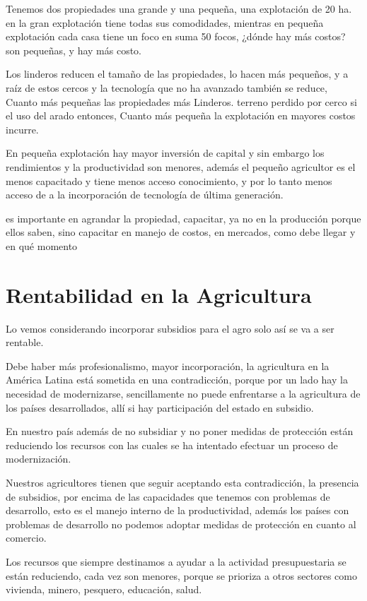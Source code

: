 \documentclass[
  letterpaper,
  DIV=11,
  numbers=noendperiod]{scrartcl}
\begin{document}
Tenemos dos propiedades una grande y una pequeña, una explotación de 20
ha. en la gran explotación tiene todas sus comodidades, mientras en
pequeña explotación cada casa tiene un foco en suma 50 focos, ¿dónde hay
más costos? son pequeñas, y hay más costo.

Los linderos reducen el tamaño de las propiedades, lo hacen más
pequeños, y a raíz de estos cercos y la tecnología que no ha avanzado
también se reduce, Cuanto más pequeñas las propiedades más Linderos.
terreno perdido por cerco si el uso del arado entonces, Cuanto más
pequeña la explotación en mayores costos incurre.

En pequeña explotación hay mayor inversión de capital y sin embargo los
rendimientos y la productividad son menores, además el pequeño
agricultor es el menos capacitado y tiene menos acceso conocimiento, y
por lo tanto menos acceso de a la incorporación de tecnología de última
generación.

es importante en agrandar la propiedad, capacitar, ya no en la
producción porque ellos saben, sino capacitar en manejo de costos, en
mercados, como debe llegar y en qué momento

\hypertarget{rentabilidad-en-la-agricultura-1}{%
\section{Rentabilidad en la
Agricultura}\label{rentabilidad-en-la-agricultura-1}}

Lo vemos considerando incorporar subsidios para el agro solo así se va a
ser rentable.

Debe haber más profesionalismo, mayor incorporación, la agricultura en
la América Latina está sometida en una contradicción, porque por un lado
hay la necesidad de modernizarse, sencillamente no puede enfrentarse a
la agricultura de los países desarrollados, allí si hay participación
del estado en subsidio.

En nuestro país además de no subsidiar y no poner medidas de protección
están reduciendo los recursos con las cuales se ha intentado efectuar un
proceso de modernización.

Nuestros agricultores tienen que seguir aceptando esta contradicción, la
presencia de subsidios, por encima de las capacidades que tenemos con
problemas de desarrollo, esto es el manejo interno de la productividad,
además los países con problemas de desarrollo no podemos adoptar medidas
de protección en cuanto al comercio.

Los recursos que siempre destinamos a ayudar a la actividad
presupuestaria se están reduciendo, cada vez son menores, porque se
prioriza a otros sectores como vivienda, minero, pesquero, educación,
salud.
\end{document}
